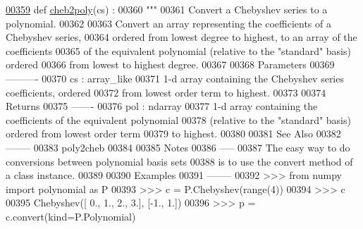 \begin{DoxyCode}
\hypertarget{namespacepyneb_1_1utils_1_1chebyshev_l00359}{}\hyperlink{namespacepyneb_1_1utils_1_1chebyshev_a640344fc14aa36e14d0e93eba4411188}{00359} \textcolor{keyword}{def }\hyperlink{namespacepyneb_1_1utils_1_1chebyshev_a640344fc14aa36e14d0e93eba4411188}{cheb2poly}(cs) :
00360     \textcolor{stringliteral}{"""}
00361 \textcolor{stringliteral}{    Convert a Chebyshev series to a polynomial.}
00362 \textcolor{stringliteral}{}
00363 \textcolor{stringliteral}{    Convert an array representing the coefficients of a Chebyshev series,}
00364 \textcolor{stringliteral}{    ordered from lowest degree to highest, to an array of the coefficients}
00365 \textcolor{stringliteral}{    of the equivalent polynomial (relative to the "standard" basis) ordered}
00366 \textcolor{stringliteral}{    from lowest to highest degree.}
00367 \textcolor{stringliteral}{}
00368 \textcolor{stringliteral}{    Parameters}
00369 \textcolor{stringliteral}{    ----------}
00370 \textcolor{stringliteral}{    cs : array\_like}
00371 \textcolor{stringliteral}{        1-d array containing the Chebyshev series coefficients, ordered}
00372 \textcolor{stringliteral}{        from lowest order term to highest.}
00373 \textcolor{stringliteral}{}
00374 \textcolor{stringliteral}{    Returns}
00375 \textcolor{stringliteral}{    -------}
00376 \textcolor{stringliteral}{    pol : ndarray}
00377 \textcolor{stringliteral}{        1-d array containing the coefficients of the equivalent polynomial}
00378 \textcolor{stringliteral}{        (relative to the "standard" basis) ordered from lowest order term}
00379 \textcolor{stringliteral}{        to highest.}
00380 \textcolor{stringliteral}{}
00381 \textcolor{stringliteral}{    See Also}
00382 \textcolor{stringliteral}{    --------}
00383 \textcolor{stringliteral}{    poly2cheb}
00384 \textcolor{stringliteral}{}
00385 \textcolor{stringliteral}{    Notes}
00386 \textcolor{stringliteral}{    -----}
00387 \textcolor{stringliteral}{    The easy way to do conversions between polynomial basis sets}
00388 \textcolor{stringliteral}{    is to use the convert method of a class instance.}
00389 \textcolor{stringliteral}{}
00390 \textcolor{stringliteral}{    Examples}
00391 \textcolor{stringliteral}{    --------}
00392 \textcolor{stringliteral}{    >>> from numpy import polynomial as P}
00393 \textcolor{stringliteral}{    >>> c = P.Chebyshev(range(4))}
00394 \textcolor{stringliteral}{    >>> c}
00395 \textcolor{stringliteral}{    Chebyshev([ 0.,  1.,  2.,  3.], [-1.,  1.])}
00396 \textcolor{stringliteral}{    >>> p = c.convert(kind=P.Polynomial)}

\end{DoxyCode}
